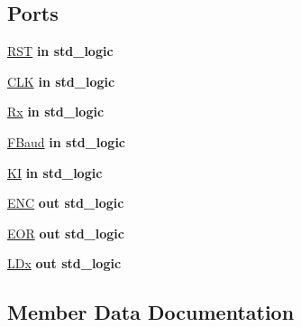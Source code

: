 \subsection*{Ports}
 \begin{DoxyCompactItemize}
\item 
\hyperlink{class_f_s_m_read_a98682ef7de2714e5bab788a2e2ff1b7f}{R\+S\+T}  {\bfseries {\bfseries \textcolor{keywordflow}{in}\textcolor{vhdlchar}{ }}} {\bfseries \textcolor{comment}{std\+\_\+logic}\textcolor{vhdlchar}{ }} 
\item 
\hyperlink{class_f_s_m_read_ab5d0ea9e968d49d94da9db07a979d402}{C\+L\+K}  {\bfseries {\bfseries \textcolor{keywordflow}{in}\textcolor{vhdlchar}{ }}} {\bfseries \textcolor{comment}{std\+\_\+logic}\textcolor{vhdlchar}{ }} 
\item 
\hyperlink{class_f_s_m_read_a5b7b5dfa3fdd403b397fc3a20f75ec69}{Rx}  {\bfseries {\bfseries \textcolor{keywordflow}{in}\textcolor{vhdlchar}{ }}} {\bfseries \textcolor{comment}{std\+\_\+logic}\textcolor{vhdlchar}{ }} 
\item 
\hyperlink{class_f_s_m_read_af29ebfe43178ab3fe4bfeb0538c18d1f}{F\+Baud}  {\bfseries {\bfseries \textcolor{keywordflow}{in}\textcolor{vhdlchar}{ }}} {\bfseries \textcolor{comment}{std\+\_\+logic}\textcolor{vhdlchar}{ }} 
\item 
\hyperlink{class_f_s_m_read_a97c032966a659a6a0d6d0b7ff63752eb}{K\+I}  {\bfseries {\bfseries \textcolor{keywordflow}{in}\textcolor{vhdlchar}{ }}} {\bfseries \textcolor{comment}{std\+\_\+logic}\textcolor{vhdlchar}{ }} 
\item 
\hyperlink{class_f_s_m_read_a7fb190ccb264ea98d9e06f4f2170a4f3}{E\+N\+C}  {\bfseries {\bfseries \textcolor{keywordflow}{out}\textcolor{vhdlchar}{ }}} {\bfseries \textcolor{comment}{std\+\_\+logic}\textcolor{vhdlchar}{ }} 
\item 
\hyperlink{class_f_s_m_read_aa72e26c017c5c6834391eb61646184e0}{E\+O\+R}  {\bfseries {\bfseries \textcolor{keywordflow}{out}\textcolor{vhdlchar}{ }}} {\bfseries \textcolor{comment}{std\+\_\+logic}\textcolor{vhdlchar}{ }} 
\item 
\hyperlink{class_f_s_m_read_ac5f7837c8070c8990d6b5f0240902f68}{L\+Dx}  {\bfseries {\bfseries \textcolor{keywordflow}{out}\textcolor{vhdlchar}{ }}} {\bfseries \textcolor{comment}{std\+\_\+logic}\textcolor{vhdlchar}{ }} 
\end{DoxyCompactItemize}


\subsection{Member Data Documentation}
\hypertarget{class_f_s_m_read_ab5d0ea9e968d49d94da9db07a979d402}{}
